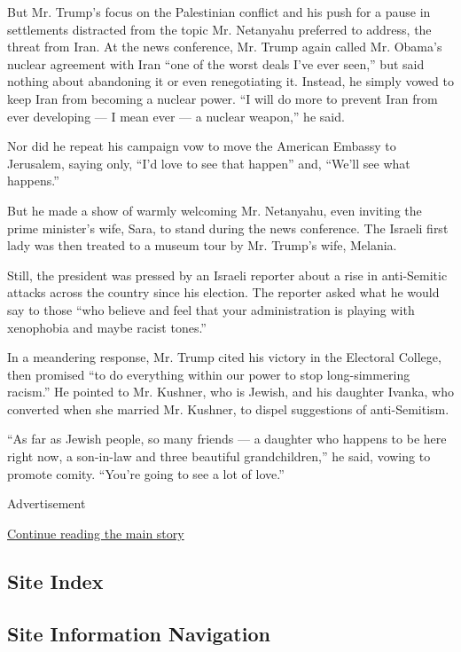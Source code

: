 But Mr. Trump's focus on the Palestinian conflict and his push for a
pause in settlements distracted from the topic Mr. Netanyahu preferred
to address, the threat from Iran. At the news conference, Mr. Trump
again called Mr. Obama's nuclear agreement with Iran ``one of the worst
deals I've ever seen,'' but said nothing about abandoning it or even
renegotiating it. Instead, he simply vowed to keep Iran from becoming a
nuclear power. ``I will do more to prevent Iran from ever developing ---
I mean ever --- a nuclear weapon,'' he said.

Nor did he repeat his campaign vow to move the American Embassy to
Jerusalem, saying only, ``I'd love to see that happen'' and, ``We'll see
what happens.''

But he made a show of warmly welcoming Mr. Netanyahu, even inviting the
prime minister's wife, Sara, to stand during the news conference. The
Israeli first lady was then treated to a museum tour by Mr. Trump's
wife, Melania.

Still, the president was pressed by an Israeli reporter about a rise in
anti-Semitic attacks across the country since his election. The reporter
asked what he would say to those ``who believe and feel that your
administration is playing with xenophobia and maybe racist tones.''

In a meandering response, Mr. Trump cited his victory in the Electoral
College, then promised ``to do everything within our power to stop
long-simmering racism.'' He pointed to Mr. Kushner, who is Jewish, and
his daughter Ivanka, who converted when she married Mr. Kushner, to
dispel suggestions of anti-Semitism.

``As far as Jewish people, so many friends --- a daughter who happens to
be here right now, a son-in-law and three beautiful grandchildren,'' he
said, vowing to promote comity. ``You're going to see a lot of love.''

Advertisement

\protect\hyperlink{after-bottom}{Continue reading the main story}

\hypertarget{site-index}{%
\subsection{Site Index}\label{site-index}}

\hypertarget{site-information-navigation}{%
\subsection{Site Information
Navigation}\label{site-information-navigation}}

